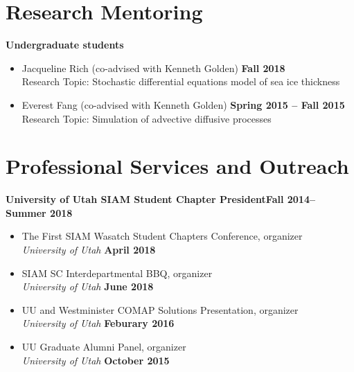 \documentclass[margin,line]{res}
\begin{document}
\begin{resume}
\section{\sc Research Mentoring}
{\bf Undergraduate students}
\begin{itemize}
\item[ ] Jacqueline Rich (co-advised with Kenneth Golden) 
\hfill {\bf Fall 2018} \\
Research Topic: Stochastic differential equations model of sea ice thickness
\item[ ] Everest Fang (co-advised with Kenneth Golden)
\hfill {\bf Spring 2015 -- Fall 2015}\\
Research Topic: Simulation of advective diffusive processes
\end{itemize}

\section{\sc Professional Services and Outreach}

{\bf University of Utah SIAM Student Chapter President}\hfill{\bf Fall 2014--Summer 2018}
\begin{itemize}
\item[ ] The First SIAM Wasatch Student Chapters Conference, organizer
\\ {\it University of Utah} \hfill {\bf April 2018}
\item[ ] SIAM SC Interdepartmental BBQ, organizer
\\ {\it University of Utah} \hfill {\bf June 2018}
\item[ ] UU and Westminister COMAP Solutions Presentation, organizer
\\ {\it University of Utah} \hfill {\bf Feburary 2016}
\item[ ] UU Graduate Alumni Panel, organizer 
\\ {\it University of Utah} \hfill {\bf October 2015}
\end{itemize}


\end{resume}
\end{document}
